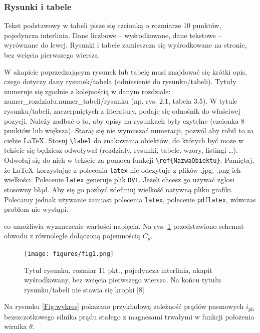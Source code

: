 \documentclass[12pt,twoside]{article}
\begin{document}
\subsubsection{Rysunki i tabele} \label{Subsec:Rysunki-i-tabele}
Tekst podstawowy w tabeli pisze się czcionką o rozmiarze 10 punktów, pojedyncza interlinia. Dane liczbowe – wyśrodkowane, dane tekstowe – wyrównane do lewej. Rysunki i tabele zamieszcza się wyśrodkowane na stronie, bez wcięcia pierwszego wiersza.

W akapicie poprzedzającym rysunek lub tabelę musi znajdować się krótki opis, czego dotyczy dany rysunek/tabela (odniesienie do rysunku/tabeli). Tytuły numeruje się zgodnie z kolejnością w danym rozdziale: numer\_rozdziału.numer\_tabeli/rysunku (np. rys. 2.1, tabela 3.5). W tytule rysunku/tabeli, zaczerpniętych z literatury, podaje się odnośnik do właściwej pozycji. Należy zadbać o to, aby opisy na rysunkach były czytelne (czcionka 8 punktów lub większa). Staraj się nie wymuszać numeracji, pozwól aby robił to za ciebie \LaTeX. Stosuj \verb!\label! do znakowania obiektów, do których być może w tekście się będziesz odwoływał (rozdziały, rysunki, tabele, wzory, listingi \ldots). Odwołuj się do nich w tekście  za pomocą funkcji \verb!\ref{NazwaObiektu}!. Pamiętaj, że \LaTeX\, korzystając z polecenia \verb|latex| nie odczytuje z plików .jpg, .png ich wielkości. Polecenie \verb|latex| generuje plik \verb|DVI|. Jeżeli chcesz go używać zgłosi stosowny błąd. Aby się go pozbyć zdefiniuj wielkość natywną pliku grafiki. Polecamy jednak używanie zamiast polecenia \verb|latex|, polecenie \verb|pdflatex|, wówczas problem nie wystąpi.\\

\begin{example}
[\ldots] co umożliwia wyznaczenie wartości napięcia. Na rys. \ref{Fig:schemat} przedstawiono schemat obwodu z równolegle dołączoną pojemnością $C_p$.
\end{example}

\begin{figure}[ht]
	\centering
	\texttt{[image: figures/fig1.png]}
	\caption{Tytuł rysunku, rozmiar 11 pkt., pojedyncza interlinia, akapit wyśrodkowany, bez wcięcia pierwszego wiersza. Na końcu tytułu rysunku/tabeli nie stawia się kropki [8]}
\label{Fig:schemat}
\end{figure}

\begin{example}
[\ldots] Na rysunku \ref{Fig:wykres} pokazano przykładową zależność prądów pasmowych $i_\mathrm{ph}$ bezszczotkowego silnika prądu stałego z magnesami trwałymi w funkcji położenia wirnika $\theta$.
\end{example}
\end{document}

